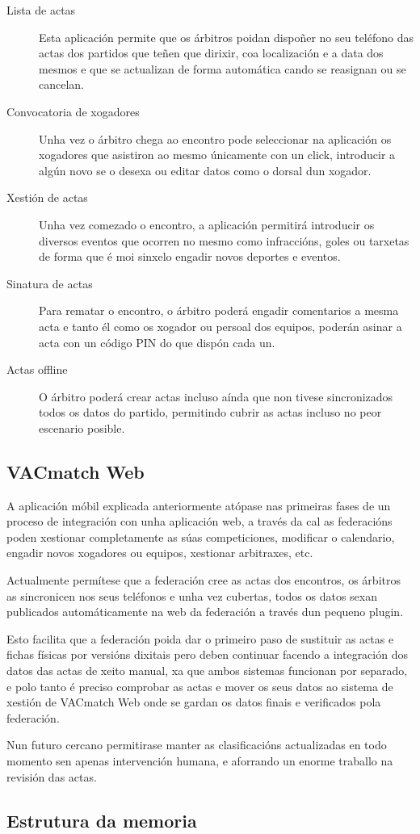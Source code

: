   \begin{description}
    \item [Lista de actas]
    Esta aplicación permite que os árbitros poidan dispoñer no seu teléfono 
das actas dos partidos que teñen que dirixir, coa localización e a data dos 
mesmos e que se actualizan de forma automática cando se reasignan ou se 
cancelan.

    \item [Convocatoria de xogadores]
    Unha vez o árbitro chega ao encontro pode seleccionar na aplicación os 
xogadores que asistiron ao mesmo únicamente con un click, introducir a algún 
novo se o desexa ou editar datos como o dorsal dun xogador.

    \item [Xestión de actas]
    Unha vez comezado o encontro, a aplicación permitirá introducir os diversos 
eventos que ocorren no mesmo como infraccións, goles ou tarxetas de forma que é 
moi sinxelo engadir novos deportes e eventos.

    \item [Sinatura de actas]
    Para rematar o encontro, o árbitro poderá engadir comentarios a mesma acta 
e tanto él como os xogador ou persoal dos equipos, poderán asinar a acta con un 
código PIN do que dispón cada un.

    \item [Actas offline]
    O árbitro poderá crear actas incluso aínda que non tivese sincronizados 
todos os datos do partido, permitindo cubrir as actas incluso no peor escenario 
posible.

  \end{description} 

    \subsection{VACmatch Web}
    A aplicación móbil explicada anteriormente atópase nas primeiras fases de 
un proceso de integración con unha aplicación web, a través da cal as 
federacións poden xestionar completamente as súas competiciones, modificar o 
calendario, engadir novos xogadores ou equipos, xestionar arbitraxes, etc.

    Actualmente permítese que a federación cree as actas dos encontros, os 
árbitros as sincronicen nos seus teléfonos e unha vez cubertas, todos os datos 
sexan publicados automáticamente na web da federación a través dun pequeno 
plugin.

    Esto facilita que a federación poida dar o primeiro paso de sustituir as 
actas e fichas físicas por versións dixitais pero deben continuar facendo a 
integración dos datos das actas de xeito manual, xa que ambos sistemas funcionan 
por separado, e polo tanto é preciso comprobar as actas e mover os seus datos 
ao sistema de xestión de VACmatch Web onde se gardan os datos finais e 
verificados pola federación.

    Nun futuro cercano permitirase manter as clasificacións actualizadas en todo 
momento sen apenas intervención humana, e aforrando un enorme traballo na 
revisión das actas.

  \subsection{Estrutura da memoria}
  
  
  